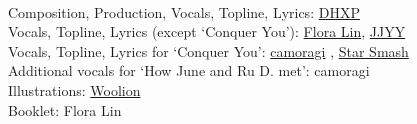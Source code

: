 \phantom{*}\\
Composition, Production, Vocals, Topline, Lyrics: \href{https://linktr.ee/dhxp}{DHXP}\\
Vocals, Topline, Lyrics (except `Conquer You'): \href{https://www.youtube.com/channel/UC7pM7YKe9U1D1Xl4s_xroBw}{Flora Lin}, \href{https://soundcloud.com/okfeather}{JJYY} \\
Vocals, Topline, Lyrics for `Conquer You': \href{https://www.camoragi.com/}{camoragi} , \href{https://soundcloud.com/starsmashofficial}{Star Smash} \\
Additional vocals for `How June and Ru D. met': camoragi\\
Illustrations: \href{https://www.pixiv.net/en/users/6200150}{Woolion}\\
Booklet: Flora Lin

\clearpage